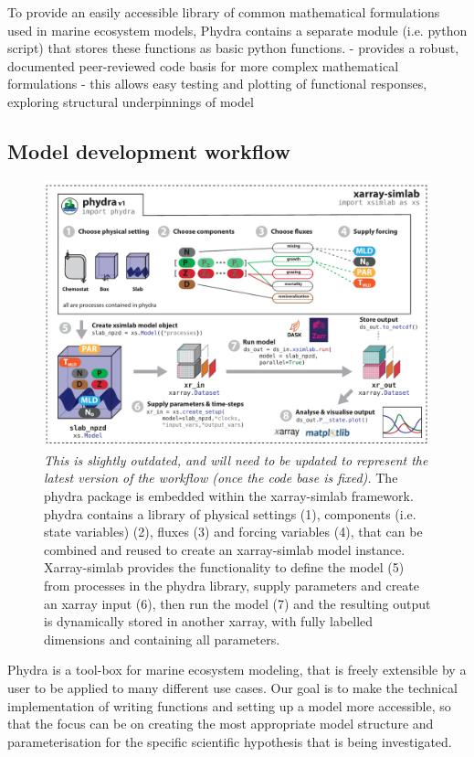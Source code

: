 \documentclass[journal abbreviations, manuscript]{copernicus}
\begin{document}
To provide an easily accessible library of common mathematical formulations used in marine ecosystem models, Phydra contains a separate module (i.e. python script) that stores these functions as basic python functions.
- provides a robust, documented peer-reviewed code basis for more complex mathematical formulations
- this allows easy testing and plotting of functional responses, exploring structural underpinnings of model




\subsection{Model development workflow}

%
\begin{figure}[t]
\includegraphics[width=12cm]{Figures/firstdraft_schematics/01__schematics_phydra_1.pdf}
\caption{\textit{This is slightly outdated, and will need to be updated to represent the latest version of the workflow (once the code base is fixed).} The phydra package is embedded within the xarray-simlab framework. phydra contains a library of physical settings (1), components (i.e. state variables) (2), fluxes (3) and forcing variables (4), that can be combined and reused to create an xarray-simlab model instance. Xarray-simlab provides the functionality to define the model (5) from processes in the phydra library, supply parameters and create an xarray input (6), then run the model (7) and the resulting output is dynamically stored in another xarray, with fully labelled dimensions and containing all parameters.}
\label{Figure:phydraschematics}
\end{figure}


Phydra is a tool-box for marine ecosystem modeling, that is freely extensible by a user to be applied to many different use cases. Our goal is to make the technical implementation of writing functions and setting up a model more accessible, so that the focus can be on creating the most appropriate model structure and parameterisation for the specific scientific hypothesis that is being investigated. 
\end{document}
